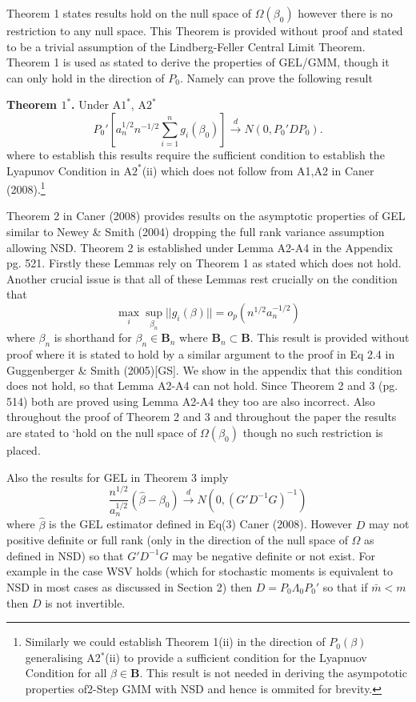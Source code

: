 \documentclass[11pt, fleqn]{article}
\begin{document}
Theorem 1 states results hold on the null space of $\Omega(\beta_0)$ however there is no restriction to any null space. This Theorem is provided without proof and stated to be a trivial assumption of the Lindberg-Feller Central Limit Theorem.  Theorem 1 is used  as stated to derive the properties of GEL/GMM, though it can only hold in the direction of $P_0$. Namely can prove the following result\newline 

\textbf{Theorem $1^*$.} Under A$1^*$, A$2^*$
\begin{equation} \label{clt}  P_0' \left[ a_n^{1/2}n^{-1/2}\sum_{i=1}^n g_i(\beta_0)\right] \overset{d}{\rightarrow} N(0,P_0'DP_0).\end{equation}
\newline 
where to establish this results  require the sufficient condition to establish the  Lyapunov Condition in A$2^*$(ii) which does not follow from A1,A2 in Caner (2008).\footnote{ Similarly we could establish Theorem 1(ii) in the direction of $P_0(\beta)$ generalising A2$^*$(ii) to provide a sufficient condition for the Lyapnuov Condition for all $\beta \in \mathbf{B}$. This result is not needed in deriving the asympototic properties of2-Step GMM with NSD and hence is ommited for brevity.}


Theorem 2 in Caner (2008) provides results on the asymptotic properties of GEL  similar to  Newey \& Smith (2004) dropping the full rank variance assumption allowing NSD. Theorem 2 is established under Lemma A2-A4 in the Appendix pg. 521. Firstly these Lemmas rely on Theorem  1 as stated which does not hold. Another crucial issue is that all of these Lemmas rest crucially on the condition that
\begin{equation}\label{gs} \max_i \sup_{\beta_n} |\!| g_i(\beta)|\!| =o_p(n^{1/2}a_n^{-1/2}) \end{equation}
where $\beta_n$ is shorthand for $\beta_n \in \mathbf{B}_n$ where $\mathbf{B}_n \subset \mathbf{B}$. This result
 is provided without proof where it is stated  to hold by a similar argument to the proof in Eq 2.4 in Guggenberger \& Smith (2005)[GS]. We show in the appendix that   this condition does not hold, so that Lemma A2-A4 can not hold. Since Theorem 2 and 3 (pg. 514) both are proved using  Lemma A2-A4 they too are also incorrect. Also throughout the proof of Theorem 2 and 3 and throughout the paper the results are stated to `hold on the null space of $\Omega(\beta_0)$ though no such restriction is placed.

Also the results for GEL in Theorem 3  imply
\begin{equation} \frac{n^{1/2}}{a_n^{1/2}}(\hat{\beta}-\beta_0)\overset{d}{\rightarrow} N(0, (G'D^{-1}G)^{-1}) \end{equation}
where $\hat{\beta}$ is the GEL estimator defined in Eq(3) Caner (2008). However $D$ may  not positive definite or full rank  (only in the direction of the null space of $\Omega$ as defined in NSD) so that $G'D^{-1}G$  may  be negative definite or not exist.   For example in the case WSV holds (which for stochastic moments is equivalent to NSD in most cases as discussed in Section 2) then $D=P_0\Lambda_0P_0'$ so that if $\bar{m}<m$  then $D$ is not invertible.
\end{document}
